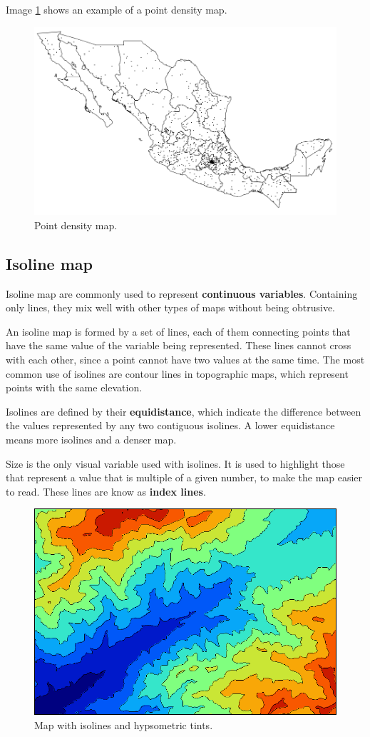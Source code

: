 Image \ref{Fig:MapPoints} shows an example of a point density map.


\begin{figure}[!hbt]
\centering
\includegraphics[width=.8\columnwidth]{Visualization/MapPoints.png}
\caption{\small Point density map.}
\label{Fig:MapPoints} 
\end{figure}


\subsection{Isoline map}

Isoline map are commonly used to represent \textbf{continuous variables}. Containing only lines, they mix well with other types of maps without being  obtrusive.

An isoline map is formed by a set of lines, each of them connecting points that have the same value of the variable being represented. These lines cannot cross with each other, since a point cannot have two values at the same time. The most common use of isolines are contour lines in topographic maps, which represent points with the same elevation.

Isolines are defined by their \textbf{equidistance}, which indicate the difference between the values represented by any two contiguous isolines. A lower equidistance means more isolines and a denser map.

Size is the only visual variable used with isolines. It is used to highlight those that represent a value that is multiple of a given number, to make the map easier to read. These lines are know as \textbf{index lines}.


\begin{figure}[!hbt]
\centering
\includegraphics[width=.8\columnwidth]{Visualization/Isolines.png}
\caption{\small Map with isolines and hypsometric tints.}
\label{Fig:Isolines} 
\end{figure}


